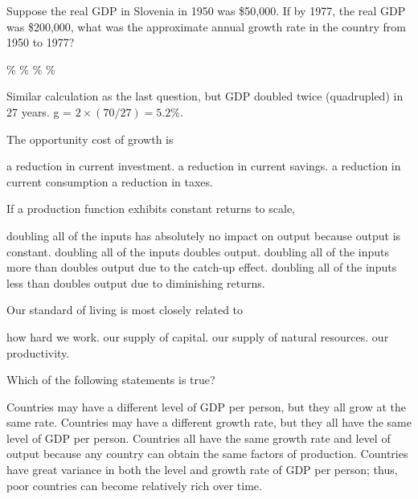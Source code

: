 \documentclass[addpoints,11pt]{exam}
\theoremstyle{definition}
\begin{document}
\begin{questions}
	\question Suppose the real GDP in Slovenia in 1950 was \$50,000. If by 1977, the real GDP was \$200,000, what was the approximate annual growth rate in the country from 1950 to 1977?
	
	\begin{choices}
		\%
		\%
		\%
		\%
	\end{choices}
	
	\begin{solution}
		Similar calculation as the last question, but GDP doubled twice (quadrupled) in 27 years. g = $2\times(70/27) = 5.2\%$.
	\end{solution}
	
\question The opportunity cost of growth is 

\begin{choices}
	\choice a reduction in current investment.
	\choice a reduction in current savings.
	\CorrectChoice a reduction in current consumption
	\choice a reduction in taxes.
\end{choices}

\question If a production function exhibits constant returns to scale, 

\begin{choices}
	\choice doubling all of the inputs has absolutely no impact on output because output is constant.
	\CorrectChoice doubling all of the inputs doubles output.
	\choice doubling all of the inputs more than doubles output due to the catch-up effect.
	\choice doubling all of the inputs less than doubles output due to diminishing returns.
\end{choices}

\question Our standard of living is most closely related to 

\begin{choices}
	\choice how hard we work.
	\choice our supply of capital.
	\choice our supply of natural resources.
	\CorrectChoice our productivity.
\end{choices}

\newpage

\question Which of the following statements is true?

\begin{choices}
	\choice Countries may have a different level of GDP per person, but they all grow at the same rate.
	\choice Countries may have a different growth rate, but they all have the same level of GDP per person.
	\choice Countries all have the same growth rate and level of output because any country can obtain the same factors of production.
	\CorrectChoice Countries have great variance in both the level and growth rate of GDP per person; thus, poor countries can become relatively rich over time.
\end{choices}


\end{questions}
\end{document}
